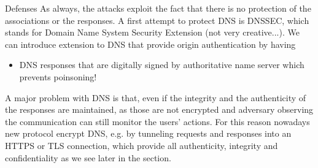 \begin{parag}{Defenses}
    As always, the attacks exploit the fact that there is no protection of the associations or the responses. A first attempt to protect DNS is DNSSEC, which stands for Domain Name System Security Extension (not very creative...). We can introduce extension to DNS that provide origin authentication by having
	\begin{itemize}
	    \item DNS responses that are digitally signed by authoritative name server which prevents poinsoning!
	\end{itemize}
	A major problem with DNS is that, even if the integrity and the authenticity of the responses are maintained, as those are not encrypted and adversary observing the communication can still monitor the users' actions. For this reason nowadays new protocol encrypt DNS, e.g. by tunneling requests and responses into an HTTPS or TLS connection, which provide all authenticity, integrity and confidentiality as we see later in the section.
\end{parag}


